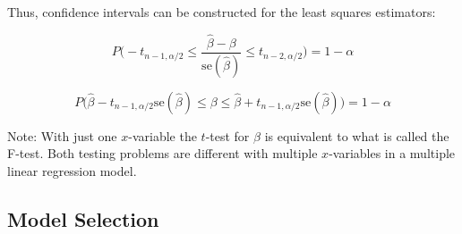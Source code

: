 \begin{paracol}{2}


\switchcolumn

Thus, confidence intervals can be constructed for the least squares estimators:

$$P \Bigg( -t_{n-1, \alpha / 2} \leq \frac{\hat{\beta} - \beta}{\text{se}(\hat{\beta})} \leq t_{n-2, \alpha / 2} \Bigg) = 1 - \alpha$$

$$P \Bigg( \hat{\beta} - t_{n-1, \alpha / 2} \text{se}(\hat{\beta}) \leq \beta \leq \hat{\beta} + t_{n-1, \alpha / 2} \text{se}(\hat{\beta}) \Bigg) = 1 - \alpha$$

\end{paracol}

Note: With just one $x$-variable the $t$-test for $\beta$ is equivalent to what is called the F-test. Both testing problems are different with multiple $x$-variables in a multiple linear regression model.

\subsection{Model Selection}

